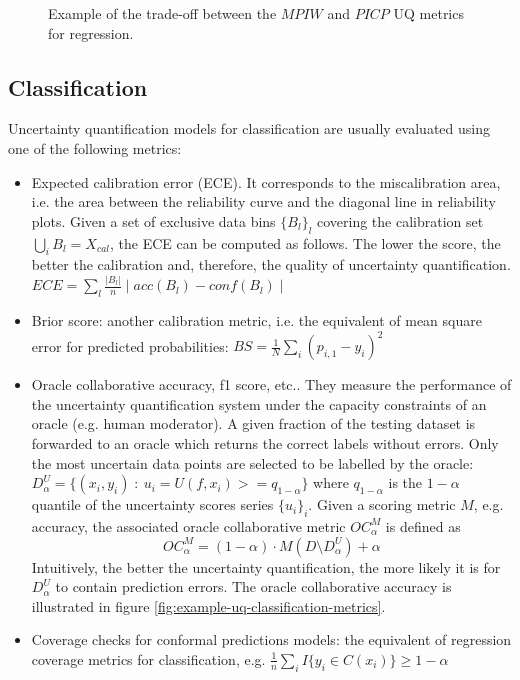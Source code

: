 \begin{figure}
        \caption{Example of the trade-off between the $MPIW$ and $PICP$ UQ metrics for regression.}
        \label{fig:example-uq-regression-metrics}
\end{figure}

\subsection{Classification}

Uncertainty quantification models for classification are usually evaluated using one of the following metrics:
\begin{itemize}
    \item Expected calibration error (ECE). It corresponds to the miscalibration area, i.e. the area between the reliability curve and the diagonal line in reliability plots. Given a set of exclusive data bins $\{B_l\}_l$ covering the calibration set $\bigcup_i B_l = X_{cal}$,  the ECE can be computed as follows. The lower the score, the better the calibration and, therefore, the quality of uncertainty quantification.
    $
    ECE = \sum_l \frac{|B_l|}{n} \mid acc(B_l) - conf(B_l)\mid
    $
    \item Brior score: another calibration metric, i.e. the equivalent of mean square error for predicted probabilities:
    $
    BS = \frac{1}{N} \sum_i {(p_{i,1} - y_i)^2} 
    $
    \item Oracle collaborative accuracy, f1 score, etc.\cite{collaborativeUQMetrics2021}. They measure the performance of the uncertainty quantification system under the capacity constraints of an oracle (e.g. human moderator). A given fraction of the testing dataset is forwarded to an oracle which returns the correct labels without errors. Only the most uncertain data points are selected to be labelled by the oracle: $D^{U}_\alpha = \{(x_i,y_i) \;:\: u_i = U(f, x_i) >= q_{1-\alpha} \}$ where $q_{1-\alpha}$ is the $1-\alpha$ quantile of the uncertainty scores series $\{u_i\}_i$. Given a scoring metric $M$, e.g. accuracy, the associated oracle collaborative metric $OC^M_{\alpha}$ is defined as
    $$
        OC^M_{\alpha} = (1 - \alpha) \cdot M(D \setminus D^U_\alpha) + \alpha 
    $$
    Intuitively, the better the uncertainty quantification, the more likely it is for $D^U_\alpha$ to contain prediction errors. The oracle collaborative accuracy is illustrated in figure \ref{fig:example-uq-classification-metrics}.
    \item Coverage checks for conformal predictions models\cite{conformalPredictions2021}: the equivalent of regression coverage metrics for classification, e.g. $\frac{1}{n} \sum_i I\{y_i \in C(x_i)\} \geq 1 - \alpha$
\end{itemize}


